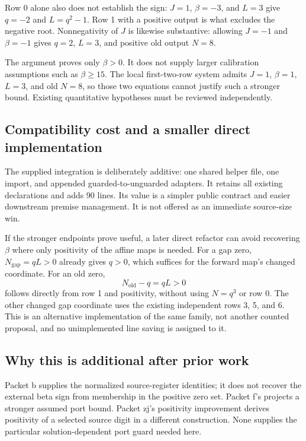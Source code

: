 \documentclass[10pt,a4paper]{article}
\newcommand{\code}[1]{\texttt{\detokenize{#1}}}
\begin{document}
Row 0 alone also does not establish the sign: $J=1$, $\beta=-3$, and $L=3$ give $q=-2$ and $L=q^2-1$. Row 1 with a positive output is what excludes the negative root. Nonnegativity of $J$ is likewise substantive: allowing $J=-1$ and $\beta=-1$ gives $q=2$, $L=3$, and positive old output $N=8$.

The argument proves only $\beta>0$. It does not supply larger calibration assumptions such as $\beta\ge15$. The local first-two-row system admits $J=1$, $\beta=1$, $L=3$, and old $N=8$, so those two equations cannot justify such a stronger bound. Existing quantitative hypotheses must be reviewed independently.

\subsection{Compatibility cost and a smaller direct implementation}

The supplied integration is deliberately additive: one shared helper file, one import, and appended guarded-to-unguarded adapters. It retains all existing declarations and adds 90 lines. Its value is a simpler public contract and easier downstream premise management. It is not offered as an immediate source-size win.

If the stronger endpoints prove useful, a later direct refactor can avoid recovering $\beta$ where only positivity of the affine maps is needed. For a gap zero, $N_{\mathrm{gap}}=qL>0$ already gives $q>0$, which suffices for the forward map's changed coordinate. For an old zero,
\[
 N_{\mathrm{old}}-q=qL>0
\]
follows directly from row 1 and positivity, without using $N=q^3$ or row 0. The other changed gap coordinate uses the existing independent rows 3, 5, and 6. This is an alternative implementation of the same family, not another counted proposal, and no unimplemented line saving is assigned to it.

\subsection{Why this is additional after prior work}

Packet b supplies the normalized source-register identities; it does not recover the external beta sign from membership in the positive zero set. Packet f's \code{PortBounds.beta_pos} projects a stronger assumed port bound. Packet zj's positivity improvement derives positivity of a selected source digit in a different construction. None supplies the particular solution-dependent port guard needed here.\cite{priorb,priorf,priorzj}
\end{document}
